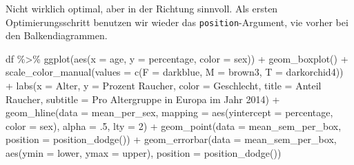 \documentclass[
]{book}
\newenvironment{Shaded}{\begin{snugshade}}{\end{snugshade}}
\newcommand{\AttributeTok}[1]{\textcolor[rgb]{0.77,0.63,0.00}{#1}}
\newcommand{\DecValTok}[1]{\textcolor[rgb]{0.00,0.00,0.81}{#1}}
\newcommand{\FunctionTok}[1]{\textcolor[rgb]{0.00,0.00,0.00}{#1}}
\newcommand{\NormalTok}[1]{#1}
\newcommand{\SpecialCharTok}[1]{\textcolor[rgb]{0.00,0.00,0.00}{#1}}
\newcommand{\StringTok}[1]{\textcolor[rgb]{0.31,0.60,0.02}{#1}}
\begin{document}
Nicht wirklich optimal, aber in der Richtung sinnvoll. Als ersten Optimierungsschritt benutzen wir wieder das \texttt{position}-Argument, vie vorher bei den Balkendiagrammen.

\begin{Shaded}
\begin{Highlighting}[]
\NormalTok{df }\SpecialCharTok{\%\textgreater{}\%} 
  \FunctionTok{ggplot}\NormalTok{(}\FunctionTok{aes}\NormalTok{(}\AttributeTok{x =}\NormalTok{ age,}
             \AttributeTok{y =}\NormalTok{ percentage,}
             \AttributeTok{color =}\NormalTok{ sex)) }\SpecialCharTok{+}
  \FunctionTok{geom\_boxplot}\NormalTok{() }\SpecialCharTok{+}
  \FunctionTok{scale\_color\_manual}\NormalTok{(}\AttributeTok{values =} \FunctionTok{c}\NormalTok{(}\AttributeTok{F =} \StringTok{\textquotesingle{}darkblue\textquotesingle{}}\NormalTok{,}
                               \AttributeTok{M =} \StringTok{\textquotesingle{}brown3\textquotesingle{}}\NormalTok{,}
                               \AttributeTok{T =} \StringTok{\textquotesingle{}darkorchid4\textquotesingle{}}\NormalTok{)) }\SpecialCharTok{+}
  \FunctionTok{labs}\NormalTok{(}\AttributeTok{x =} \StringTok{\textquotesingle{}Alter\textquotesingle{}}\NormalTok{,}
       \AttributeTok{y =} \StringTok{\textquotesingle{}Prozent Raucher\textquotesingle{}}\NormalTok{,}
       \AttributeTok{color =} \StringTok{\textquotesingle{}Geschlecht\textquotesingle{}}\NormalTok{,}
       \AttributeTok{title =} \StringTok{\textquotesingle{}Anteil Raucher\textquotesingle{}}\NormalTok{,}
       \AttributeTok{subtitle =} \StringTok{\textquotesingle{}Pro Altergruppe in Europa im Jahr 2014\textquotesingle{}}\NormalTok{) }\SpecialCharTok{+}
  \FunctionTok{geom\_hline}\NormalTok{(}\AttributeTok{data =}\NormalTok{ mean\_per\_sex,}
             \AttributeTok{mapping =} \FunctionTok{aes}\NormalTok{(}\AttributeTok{yintercept =}\NormalTok{ percentage,}
                           \AttributeTok{color =}\NormalTok{ sex),}
             \AttributeTok{alpha =}\NormalTok{ .}\DecValTok{5}\NormalTok{,}
             \AttributeTok{lty =} \DecValTok{2}\NormalTok{) }\SpecialCharTok{+}
  \FunctionTok{geom\_point}\NormalTok{(}\AttributeTok{data =}\NormalTok{ mean\_sem\_per\_box,}
             \AttributeTok{position =} \FunctionTok{position\_dodge}\NormalTok{()) }\SpecialCharTok{+}
  \FunctionTok{geom\_errorbar}\NormalTok{(}\AttributeTok{data =}\NormalTok{ mean\_sem\_per\_box,}
                \FunctionTok{aes}\NormalTok{(}\AttributeTok{ymin =}\NormalTok{ lower,}
                    \AttributeTok{ymax =}\NormalTok{ upper),}
             \AttributeTok{position =} \FunctionTok{position\_dodge}\NormalTok{())}
\end{Highlighting}
\end{Shaded}
\end{document}
